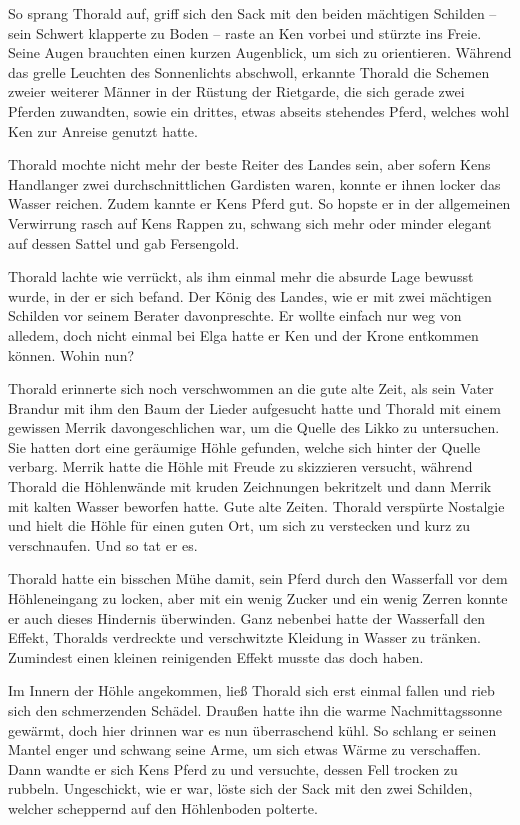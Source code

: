 \documentclass[10pt, a4paper, oneside]{book}
\begin{document}
So sprang Thorald auf, griff sich den Sack mit den beiden mächtigen Schilden – sein Schwert klapperte zu Boden – raste an Ken vorbei und stürzte ins Freie. Seine Augen brauchten einen kurzen Augenblick, um sich zu orientieren. Während das grelle Leuchten des Sonnenlichts abschwoll, erkannte Thorald die Schemen zweier weiterer Männer in der Rüstung der Rietgarde, die sich gerade zwei Pferden zuwandten, sowie ein drittes, etwas abseits stehendes Pferd, welches wohl Ken zur Anreise genutzt hatte.

Thorald mochte nicht mehr der beste Reiter des Landes sein, aber sofern Kens Handlanger zwei durchschnittlichen Gardisten waren, konnte er ihnen locker das Wasser reichen. Zudem kannte er Kens Pferd gut. So hopste er in der allgemeinen Verwirrung rasch auf Kens Rappen zu, schwang sich mehr oder minder elegant auf dessen Sattel und gab Fersengold.

Thorald lachte wie verrückt, als ihm einmal mehr die absurde Lage bewusst wurde, in der er sich befand. Der König des Landes, wie er mit zwei mächtigen Schilden vor seinem Berater davonpreschte. Er wollte einfach nur weg von alledem, doch nicht einmal bei Elga hatte er Ken und der Krone entkommen können. Wohin nun?

Thorald erinnerte sich noch verschwommen an die gute alte Zeit, als sein Vater Brandur mit ihm den Baum der Lieder aufgesucht hatte und Thorald mit einem gewissen Merrik davongeschlichen war, um die Quelle des Likko zu untersuchen. Sie hatten dort eine geräumige Höhle gefunden, welche sich hinter der Quelle verbarg. Merrik hatte die Höhle mit Freude zu skizzieren versucht, während Thorald die Höhlenwände mit kruden Zeichnungen bekritzelt und dann Merrik mit kalten Wasser beworfen hatte. Gute alte Zeiten. Thorald verspürte Nostalgie und hielt die Höhle für einen guten Ort, um sich zu verstecken und kurz zu verschnaufen. Und so tat er es.\bigskip







Thorald hatte ein bisschen Mühe damit, sein Pferd durch den Wasserfall vor dem Höhleneingang zu locken, aber mit ein wenig Zucker und ein wenig Zerren konnte er auch dieses Hindernis überwinden. Ganz nebenbei hatte der Wasserfall den Effekt, Thoralds verdreckte und verschwitzte Kleidung in Wasser zu tränken. Zumindest einen kleinen reinigenden Effekt musste das doch haben.

Im Innern der Höhle angekommen, ließ Thorald sich erst einmal fallen und rieb sich den schmerzenden Schädel. Draußen hatte ihn die warme Nachmittagssonne gewärmt, doch hier drinnen war es nun überraschend kühl. So schlang er seinen Mantel enger und schwang seine Arme, um sich etwas Wärme zu verschaffen. Dann wandte er sich Kens Pferd zu und versuchte, dessen Fell trocken zu rubbeln. Ungeschickt, wie er war, löste sich der Sack mit den zwei Schilden, welcher scheppernd auf den Höhlenboden polterte.
\end{document}
